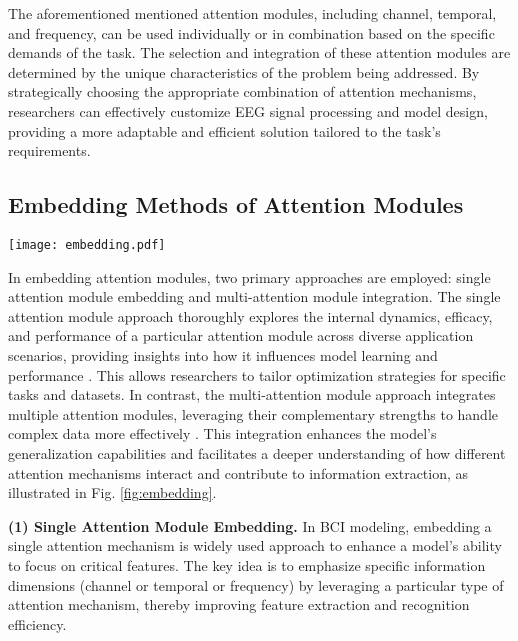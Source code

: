 \documentclass[preprint,12pt]{elsarticle}
\begin{document}
The aforementioned mentioned attention modules, including channel, temporal, and frequency, can be used individually or in combination based on the specific demands of the task. The selection and integration of these attention modules are determined by the unique characteristics of the problem being addressed. By strategically choosing the appropriate combination of attention mechanisms, researchers can effectively customize EEG signal processing and model design, providing a more adaptable and efficient solution tailored to the task’s requirements.

\subsection{Embedding Methods of Attention Modules}

\begin{figure*}
\centering
\texttt{[image: embedding.pdf]}
\caption{Embedding Methods of Attention Modules}
\label{fig:embedding}
\end{figure*}

In embedding attention modules, two primary approaches are employed: single attention module embedding and multi-attention module integration. The single attention module approach thoroughly explores the internal dynamics, efficacy, and performance of a particular attention module across diverse application scenarios, providing insights into how it influences model learning and performance \cite{lv2022attention}. This allows researchers to tailor optimization strategies for specific tasks and datasets. In contrast, the multi-attention module approach integrates multiple attention modules, leveraging their complementary strengths to handle complex data more effectively \cite{fukui2019attention}. This integration enhances the model's generalization capabilities and facilitates a deeper understanding of how different attention mechanisms interact and contribute to information extraction, as illustrated in Fig. \ref{fig:embedding}.

\textbf{(1) Single Attention Module Embedding.} In BCI modeling, embedding a single attention mechanism is widely used approach to enhance a model's ability to focus on critical features. The key idea is to emphasize specific information dimensions (channel or temporal or frequency) by leveraging a particular type of attention mechanism, thereby improving feature extraction and recognition efficiency.
\end{document}
